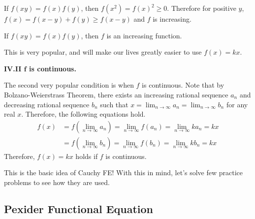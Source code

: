 \documentclass[../../main.tex]{subfiles}
\begin{document}
If $f(xy) = f(x) f(y)$, then $f(x^2) = f(x)^2 \geq 0$. Therefore
for positive $y$, $f(x) = f(x - y) + f(y) \geq f(x - y)$ and
$f$ is increasing.

\begin{important}
If $f(xy) = f(x) f(y)$, then $f$ is an increasing function.
\end{important}

This is very popular, and will make our lives greatly easier
to use $f(x) = kx$.

{\large\textbf{IV.II $\mathbf{f}$ is continuous.}}

The second very popular condition is when $f$ is continuous.
Note that by Bolzano-Weierstrass Theorem, there exists
an increasing rational sequence $a_n$ and decreasing rational
sequence $b_n$ such that $x = \lim_{n \to \infty} a_n =
\lim_{n \to \infty} b_n$ for any real $x$. Therefore,
the following equations hold.
\begin{align*}
    f(x)
    &= f \left( \lim_{n \to \infty} a_n \right)
    = \lim_{n \to \infty} f(a_n)
    = \lim_{n \to \infty} ka_n
    = kx \\
    &= f \left( \lim_{n \to \infty} b_n \right)
    = \lim_{n \to \infty} f(b_n)
    = \lim_{n \to \infty} kb_n
    = kx
\end{align*}
Therefore, $f(x) = kx$ holds if $f$ is continuous.

This is the basic idea of Cauchy FE! With this in mind,
let's solve few practice problems to see how they are used.





\subsection{Pexider Functional Equation}
\end{document}

